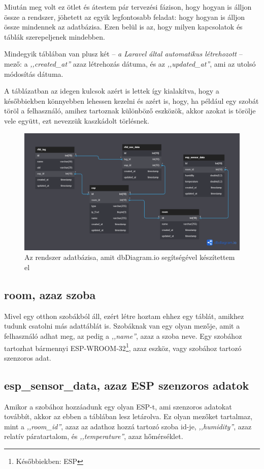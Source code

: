 \documentclass[
]{thesis-ekf}
\theoremstyle{definition}
\theoremstyle{remark}
\begin{document}
	Miután meg volt ez ötlet és átestem pár tervezési fázison, hogy hogyan is álljon össze a rendszer, jöhetett az egyik legfontosabb feladat: hogy hogyan is álljon össze mindennek az adatbázisa. Ezen belül is az, hogy milyen kapcsolatok és táblák szerepeljenek mindebben.
	
	Mindegyik táblában van plusz két -- \emph{a Laravel által automatikus létrehozott} -- mező: a \emph{,,created\_at''} azaz létrehozás dátuma, és az \emph{,,updated\_at''}, ami az utolsó módosítás dátuma.
	
	A táblázatban az idegen kulcsok azért is lettek így kialakítva, hogy a későbbiekben könnyebben lehessen kezelni és azért is, hogy, ha például egy szobát töröl a felhasználó, amihez tartoznak különböző eszközök, akkor azokat is törölje vele együtt, ezt nevezzük kaszkádolt törlésnek.
	\begin{figure}[ht!]
		\centering
		\includegraphics[width=1\textwidth]{./src/database}
		\caption{Az rendszer adatbázisa, amit dbDiagram.io segítségével készítettem el}
		\label{database-fig}
	\end{figure}	

	\subsection*{room, azaz szoba}
	Mivel egy otthon szobákból áll, ezért létre hoztam ehhez egy táblát, amikhez tudunk csatolni más adattáblát is. Szobáknak van egy olyan mezője, amit a felhasználó adhat meg, az pedig a \emph{,,name''}, azaz a szoba neve. Egy szobához tartozhat bármennyi ESP-WROOM-32\footnote{Későbbiekben: ESP}, azaz eszköz, vagy szobához tartozó szenzoros adat.
	
	\subsection*{esp\_sensor\_data, azaz ESP szenzoros adatok}
	Amikor a szobához hozzáadunk egy olyan ESP-t, ami szenzoros adatokat továbbít, akkor az ebben a táblában lesz letárolva. Ez olyan mezőket tartalmaz, mint a \emph{,,room\_id''}, azaz az adathoz hozzá tartozó szoba id-je, \emph{,,humidity''}, azaz relatív páratartalom, és \emph{,,temperature''}, azaz hőmérséklet.
	
\end{document}
